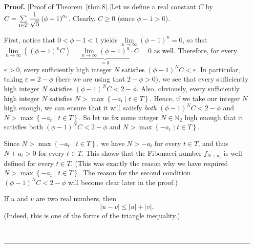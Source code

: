 \documentclass[numbers=enddot,12pt,final,onecolumn,notitlepage]{scrartcl}%
\numberwithin{exer}{section}
\theoremstyle{definition}
\newenvironment{proof}[1][Proof]{\noindent\textbf{#1.} }{\ \rule{0.5em}{0.5em}}
\let\sumnonlimits\sum
\renewcommand{\sum}{\sumnonlimits\limits}
\begin{document}
\begin{proof}
[Proof of Theorem~\ref{thm.8}.]Let us define a real constant $C$ by
$C=\sum\limits_{t\in T}\dfrac{1}{\sqrt{5}}\left(  \phi-1\right)  ^{a_{t}}$.
Clearly, $C\geq0$ (since $\phi-1>0$).

First, notice that $0<\phi-1<1$ yields $\lim\limits_{n\rightarrow\infty
}\left(  \phi-1\right)  ^{n}=0$, so that $\lim\limits_{n\rightarrow\infty
}\left(  \left(  \phi-1\right)  ^{n}C\right)  =\underbrace{\lim
\limits_{n\rightarrow\infty}\left(  \phi-1\right)  ^{n}}_{=0}\cdot C=0$ as
well. Therefore, for every $\varepsilon>0$, every sufficiently high integer
$N$ satisfies $\left(  \phi-1\right)  ^{N}C<\varepsilon$. In particular,
taking $\varepsilon=2-\phi$ (here we are using that $2-\phi>0$), we see that
every sufficiently high integer $N$ satisfies $\left(  \phi-1\right)
^{N}C<2-\phi$. Also, obviously, every sufficiently high integer $N$ satisfies
$N>\max\left\{  -a_{t}\mid t\in T\right\}  $. Hence, if we take our integer
$N$ high enough, we can ensure that it will satisfy \textit{both} $\left(
\phi-1\right)  ^{N}C<2-\phi$ and $N>\max\left\{  -a_{t}\mid t\in T\right\}  $.
So let us fix some integer $N\in\mathbb{N}_{2}$ high enough that it satisfies
both $\left(  \phi-1\right)  ^{N}C<2-\phi$ and $N>\max\left\{  -a_{t}\mid t\in
T\right\}  $.

Since $N>\max\left\{  -a_{t}\mid t\in T\right\}  $, we have $N>-a_{t}$ for
every $t\in T$, and thus $N+a_{t}>0$ for every $t\in T$. This shows that the
Fibonacci number $f_{N+a_{t}}$ is well-defined for every $t\in T$. (This was
exactly the reason why we have required $N>\max\left\{  -a_{t}\mid t\in
T\right\}  $. The reason for the second condition $\left(  \phi-1\right)
^{N}C<2-\phi$ will become clear later in the proof.)

If $u$ and $v$ are two real numbers, then
\begin{equation}
\left|  u-v \right|  \leq\left|  u\right|  + \left|  v\right|  .
\label{pf.thm.8.triangle1}%
\end{equation}
(Indeed, this is one of the forms of the triangle inequality.)


\end{proof}
\end{document}
